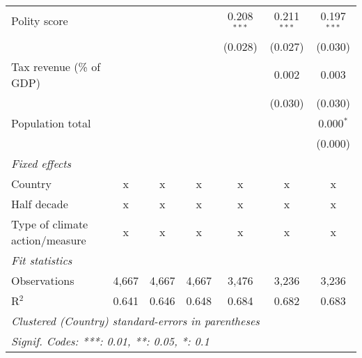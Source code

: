 \begin{tabular}{lcccccc}
   Polity score                                                         &         &                &                & 0.208$^{***}$  & 0.211$^{***}$  & 0.197$^{***}$\\   
                                                                        &         &                &                & (0.028)        & (0.027)        & (0.030)\\   
   Tax revenue (\% of GDP)                                              &         &                &                &                & 0.002          & 0.003\\   
                                                                        &         &                &                &                & (0.030)        & (0.030)\\   
   Population total                                                     &         &                &                &                &                & 0.000$^{*}$\\   
                                                                        &         &                &                &                &                & (0.000)\\   
   \emph{Fixed effects}\\
   Country                                                              & x       & x              & x              & x              & x              & x\\  
   Half decade                                                          & x       & x              & x              & x              & x              & x\\  
   Type of climate action/measure                                       & x       & x              & x              & x              & x              & x\\  
   \midrule \emph{Fit statistics}\\
   Observations                                                         & 4,667   & 4,667          & 4,667          & 3,476          & 3,236          & 3,236\\  
   R$^2$                                                                & 0.641   & 0.646          & 0.648          & 0.684          & 0.682          & 0.683\\  
   \midrule
   \multicolumn{7}{l}{\emph{Clustered (Country) standard-errors in parentheses}}\\
   \multicolumn{7}{l}{\emph{Signif. Codes: ***: 0.01, **: 0.05, *: 0.1}}\\
\end{tabular}
\par\endgroup


